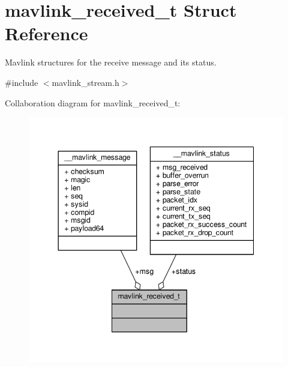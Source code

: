 \hypertarget{structmavlink__received__t}{\section{mavlink\+\_\+received\+\_\+t Struct Reference}
\label{structmavlink__received__t}
}


Mavlink structures for the receive message and its status.  




{\ttfamily \#include $<$mavlink\+\_\+stream.\+h$>$}



Collaboration diagram for mavlink\+\_\+received\+\_\+t\+:
\nopagebreak
\begin{figure}[H]
\begin{center}
\leavevmode
\includegraphics[width=344pt]{structmavlink__received__t__coll__graph}
\end{center}
\end{figure}
